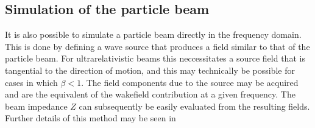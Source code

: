 \subsection{Simulation of the particle beam}

It is also possible to simulate a particle beam directly in the frequency domain. This is done by defining a wave source that produces a field similar to that of the particle beam. For ultrarelativistic beams this neccessitates a source field that is tangential to the direction of motion, and this may technically be possible for cases in which $\beta < 1$. The field components due to the source may be acquired and are the equivalent of the wakefield contribution at a given frequency. The beam impedance $Z$ can subsequently be easily evaluated from the resulting fields. Further details of this method may be seen in \cite{Kononenko:TransBeamLoading}

